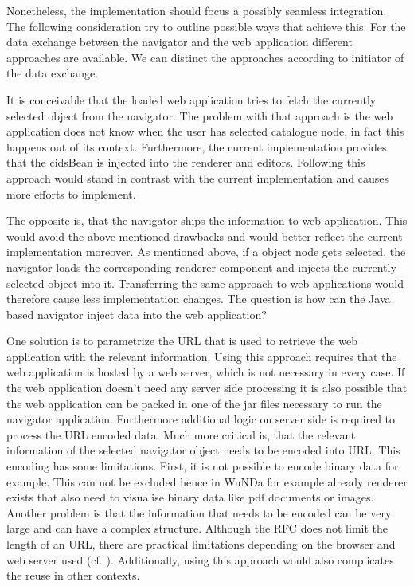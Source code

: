 Nonetheless, the implementation should focus a possibly seamless integration.
The following consideration try to outline possible ways that achieve this.
For the data exchange between the navigator and the web application different approaches are available.
We can distinct the approaches according to initiator of the data exchange.

It is conceivable that the loaded web application tries to fetch the currently selected object from the navigator.
The problem with that approach is the web application does not know when the user has selected catalogue node, in fact this happens out of its context. Furthermore, the current implementation provides that the cidsBean is injected into the renderer and editors. Following this approach would stand in contrast with the current implementation and causes more efforts to implement.

The opposite is, that the navigator ships the information to web application.
This would avoid the above mentioned drawbacks and would better reflect the current implementation moreover.
As mentioned above, if a object node gets selected, the navigator loads the corresponding renderer component and injects the currently selected object into it.
Transferring the same approach to web applications would therefore cause less implementation changes.
The question is how can the Java based navigator inject data into the web application? 

One solution is to parametrize the URL that is used to retrieve the web application with the relevant information.
Using this approach requires that the web application is hosted by a web server, which is not necessary in every case.
If the web application doesn't need any server side processing it is also possible that the web application can be packed in one of the jar files necessary to run the navigator application.
Furthermore additional logic on server side is required to process the URL encoded data.
Much more critical is, that the relevant information of the selected navigator object needs to be encoded into URL.
This encoding has some limitations.
First, it is not possible to encode binary data for example.
This can not be excluded hence in WuNDa for example already renderer exists that also need to visualise binary data like pdf documents or images.
Another problem is that the information that needs to be encoded can be very large and can have a complex structure.
Although the RFC \autocite{conception:rfc-uri}  does not limit the length of an URL, there are practical limitations depending on the browser and web server used (cf. \autocite{conception:uri-length}).
Additionally, using this approach would also complicates the reuse in other contexts.

